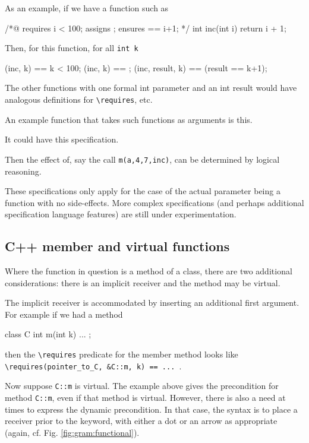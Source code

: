 As an example, if we have a function such as 
\begin{listing-nonumber}
/*@ requires i < 100;
       assigns \empty;
       ensures \result == i+1;
       */
int inc(int i) { return i + 1; }
\end{listing-nonumber}
Then, for this function, for all \lstinline|int k|
\begin{listing-nonumber}
\requires(inc, k) == k < 100;
\assigns(inc, k) == \empty;
\ensures(inc, result, k) == (result == k+1);
\end{listing-nonumber}
The other functions with one formal int parameter and an int result would have analogous definitions for \lstinline|\requires|, etc.

An example function that takes such functions as arguments is this.



It could have this specification.



Then the effect of, say the call \lstinline|m(a,4,7,inc)|, can be determined by logical reasoning.

These specifications only apply for the case of the actual parameter being a function with no side-effects. More complex specifications (and perhaps additional specification language features) are still under experimentation.

\subsection{C++ member and virtual functions}

Where the function in question is a method of a class, there are two additional considerations: there is an implicit receiver and the method may be virtual.

The implicit receiver is accommodated by inserting an additional first argument. For example if we had a method
\begin{listing-nonumber}
class C {
  int m(int k) { ... }
};
\end{listing-nonumber}
then the  \lstinline|\requires| predicate for the member method looks like \lstinline|\requires(pointer_to_C, &C::m, k) == ... |.

Now suppose \lstinline|C::m| is virtual. The example above gives the precondition for method \lstinline|C::m|, even if that method is virtual. However, there is also a need at times to express the dynamic precondition. In that case, the syntax is to place a receiver prior to the keyword, with either a dot or an arrow as appropriate (again, cf. Fig. \ref{fig:gram:functional}).


